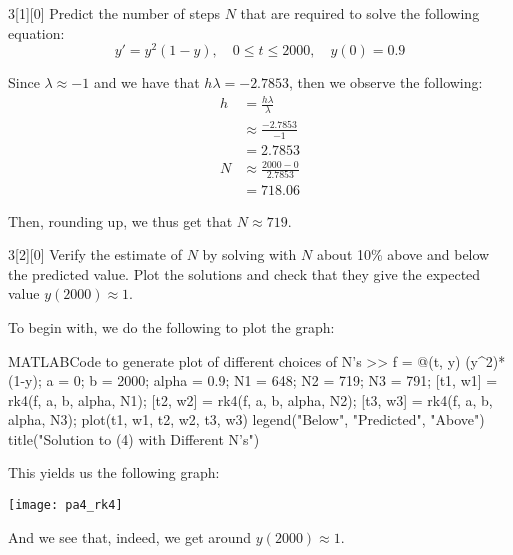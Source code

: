 \documentclass{article}
\begin{document}
\begin{hw}{3}[1][0]
	Predict the number of steps $N$ that are required to solve the following equation:
	\begin{equation*}
		y' = y^{2}(1-y), \quad 0 \leq t \leq 2000, \quad y(0) = 0.9
	\end{equation*}
\end{hw}
\begin{solution}
	Since $\lambda \approx -1$ and we have that $h\lambda = -2.7853$, then we observe the following:
	\begin{align*}
		h &= \frac{h\lambda}{\lambda} \\
		&\approx \frac{-2.7853}{-1} \\
		&= 2.7853 \\
		N &\approx \frac{2000 - 0}{2.7853} \\
		&= 718.06
	\end{align*}

	Then, rounding up, we thus get that $N \approx 719$.
\end{solution}

\begin{hw}{3}[2][0]
	Verify the estimate of $N$ by solving with $N$ about 10\% above and below the predicted value. Plot the solutions and check that they give the expected value $y(2000) \approx 1$.
\end{hw}
\begin{solution}
To begin with, we do the following to plot the graph:
\begin{code}{MATLAB}{Code to generate plot of different choices of N's}
>> f = @(t, y) (y^2)*(1-y);
a = 0;
b = 2000;
alpha = 0.9;
N1 = 648;
N2 = 719;
N3 = 791;
[t1, w1] = rk4(f, a, b, alpha, N1);
[t2, w2] = rk4(f, a, b, alpha, N2);
[t3, w3] = rk4(f, a, b, alpha, N3);
plot(t1, w1, t2, w2, t3, w3)
legend("Below", "Predicted", "Above")
title("Solution to (4) with Different N's")
\end{code}

This yields us the following graph:
\begin{center}
	\texttt{[image: pa4\_rk4]}
\end{center}

And we see that, indeed, we get around $y(2000) \approx 1$.
\end{solution}
\end{document}
